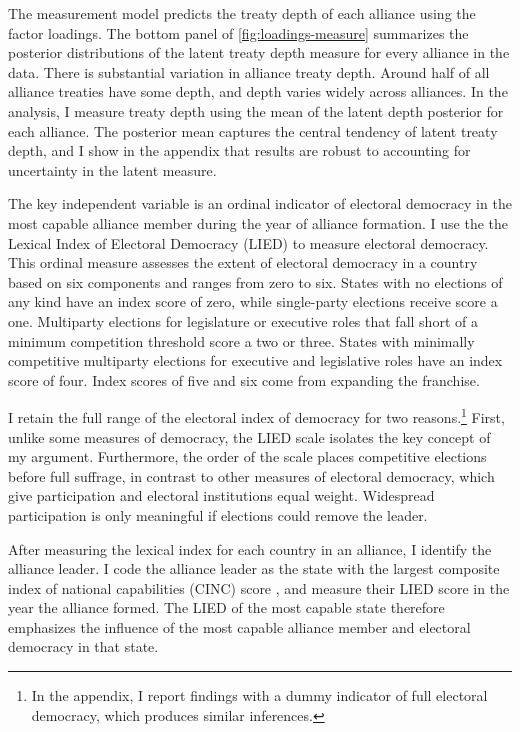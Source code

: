 \documentclass[12pt]{article}
\begin{document}
The measurement model predicts the treaty depth of each alliance using the factor loadings. 
The bottom panel of \autoref{fig:loadings-measure} summarizes the posterior distributions of the latent treaty depth measure for every alliance in the data. 
There is substantial variation in alliance treaty depth. 
Around half of all alliance treaties have some depth, and depth varies widely across alliances.
In the analysis, I measure treaty depth using the mean of the latent depth posterior for each alliance. 
The posterior mean captures the central tendency of latent treaty depth, and I show in the appendix that results are robust to accounting for uncertainty in the latent measure. 


The key independent variable is an ordinal indicator of electoral democracy in the most capable alliance member during the year of alliance formation. 
I use the the Lexical Index of Electoral Democracy (LIED) \citep{Skaaningetal2015} to measure electoral democracy.
This ordinal measure assesses the extent of electoral democracy in a country based on six components and ranges from zero to six.  
States with no elections of any kind have an index score of zero, while single-party elections receive score a one. 
Multiparty elections for legislature or executive roles that fall short of a minimum competition threshold score a two or three. 
States with minimally competitive multiparty elections for executive and legislative roles have an index score of four.
Index scores of five and six come from expanding the franchise.


I retain the full range of the electoral index of democracy for two reasons.\footnote{In the appendix, I report findings with a dummy indicator of full electoral democracy, which produces similar inferences.}
First, unlike some measures of democracy, the LIED scale isolates the key concept of my argument.
Furthermore, the order of the scale places competitive elections before full suffrage, in contrast to other measures of electoral democracy, which give participation and electoral institutions equal weight. 
Widespread participation is only meaningful if elections could remove the leader.


After measuring the lexical index for each country in an alliance, I identify the alliance leader.   
I code the alliance leader as the state with the largest composite index of national capabilities (CINC) score \citep{SingerCINC1988}, and measure their LIED score in the year the alliance formed.
The LIED of the most capable state therefore emphasizes the influence of the most capable alliance member and electoral democracy in that state.
\end{document}
